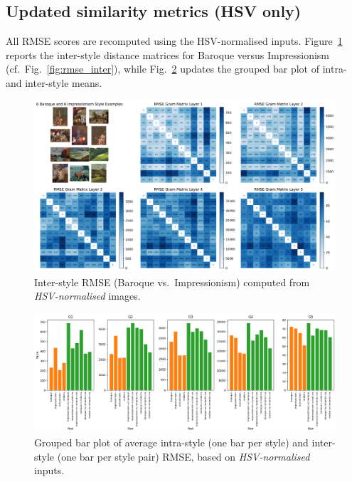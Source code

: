 \documentclass[a4paper,11pt]{article}
\begin{document}
\subsection{Updated similarity metrics (HSV only)}\label{sec:updated_metrics}
All RMSE scores are recomputed using the HSV-normalised inputs.
Figure~\ref{fig:rmse_inter_norm} reports the inter-style distance matrices for Baroque versus Impressionism (cf.\ Fig.~\ref{fig:rmse_inter}), while Fig.~\ref{fig:rmse_barplot_norm} updates the grouped bar plot of intra- and inter-style means.

\begin{figure}[htbp]
  \centering
  \includegraphics[width=\textwidth]{../figures/rmse_norm_inter.png}
  \caption{Inter-style RMSE (Baroque vs.\ Impressionism) computed from \emph{HSV-normalised} images.}
  \label{fig:rmse_inter_norm}
\end{figure}

\begin{figure}[htbp]
  \centering
  \includegraphics[width=\textwidth]{../figures/rmse_barplot_norm.png}
  \caption{Grouped bar plot of average intra-style (one bar per style) and inter-style (one bar per style pair) RMSE, based on \emph{HSV-normalised} inputs.}
  \label{fig:rmse_barplot_norm}
\end{figure}
\end{document}
